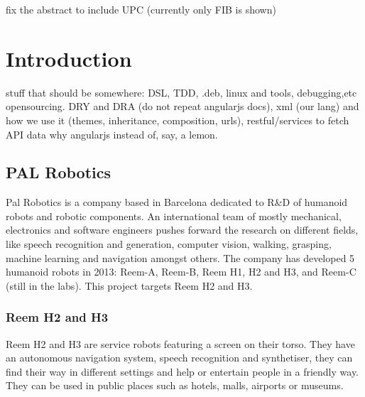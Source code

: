 
fix the abstract to include UPC (currently only FIB is shown)
\cite{Darwin} \cite{Crockford} \cite{Stefanov} \cite{AngularJSGuide} \cite{Fowler}


\chapter{Introduction}
stuff that should be somewhere: DSL, TDD, .deb, linux and tools, debugging,etc opensourcing. DRY and DRA (do not repeat angularjs docs), xml (our lang) and how we use it (themes, inheritance, composition, urls), restful/services to fetch API data
why angularjs instead of, say, a lemon.

\section{PAL Robotics}
Pal Robotics is a company based in Barcelona dedicated to R\&D of humanoid robots and robotic components. 
An international team of mostly mechanical, electronics and software engineers pushes forward the research on different fields, like speech recognition and generation, computer vision, walking, grasping, machine learning and navigation amongst others.
The company has developed 5 humanoid robots in 2013: Reem-A, Reem-B, Reem H1, H2 and H3, and Reem-C (still in the labs).
This project targets Reem H2 and H3.

\subsection{Reem H2 and H3}
Reem H2 and H3 are service robots featuring a screen on their torso.
They have an autonomous navigation system, speech recognition and synthetiser, they can find their way in different settings and help or entertain people in a friendly way.
They can be used in public places such as hotels, malls, airports or museums.


